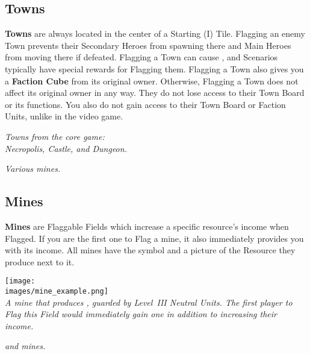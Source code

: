 \begin{multicols}{2}
\subsection*{Towns}
\textbf{Towns} are always located in the center of a Starting (I) Tile.
Flagging an enemy Town prevents their Secondary Heroes from spawning there and Main Heroes from moving there if defeated.
Flagging a Town can cause , and Scenarios typically have special rewards for Flagging them.
Flagging a Town also gives you a \textbf{Faction Cube} from its original owner.
Otherwise, Flagging a Town does not affect its original owner in any way.
They do not lose access to their Town Board or its functions.
You also do not gain access to their Town Board or Faction Units, unlike in the video game.

\begin{center}
  \textit{Towns from the core game:\\Necropolis, Castle, and Dungeon.}

  \vspace{1.8em}

  \textit{Various  mines.}
\end{center}

\columnbreak

\subsection*{Mines}
{\textbf{Mines}} are Flaggable Fields which increase a specific resource's income when Flagged.
If you are the first one to Flag a mine, it also immediately provides you with its income.
All mines have the  symbol and a picture of the Resource they produce next to it.

\begin{center}
  \texttt{[image: \\images/mine\_example.png]}\\
  \textit{A mine that produces , guarded by \mbox{Level III} Neutral Units.
    The first player to Flag this Field would immediately gain one  in addition to increasing their  income.
  }

  \vspace*{\fill}
  \textit{ and  mines.}
\end{center}
\end{multicols}

